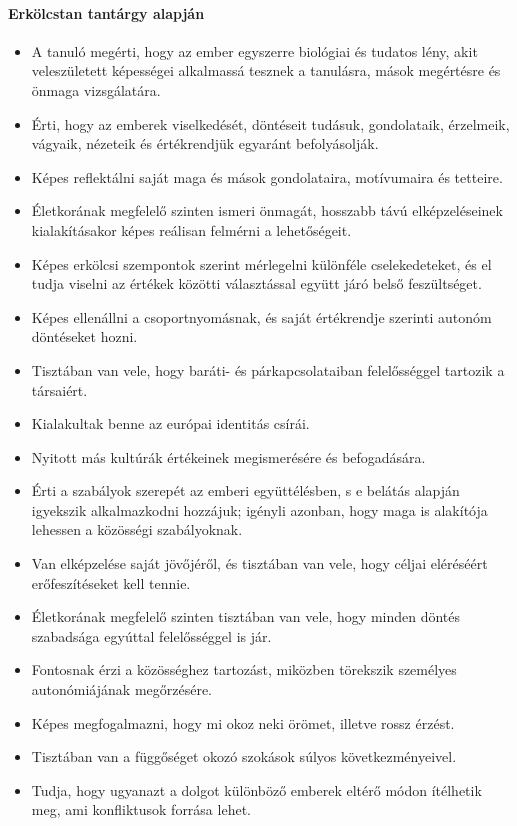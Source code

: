 \paragraph{Erkölcstan tantárgy alapján}
\begin{itemize}
\item A tanuló megérti, hogy az ember egyszerre biológiai és tudatos lény, akit veleszületett képességei alkalmassá tesznek a tanulásra, mások megértésre és önmaga vizsgálatára.
\item Érti, hogy az emberek viselkedését, döntéseit tudásuk, gondolataik, érzelmeik, vágyaik, nézeteik és értékrendjük egyaránt befolyásolják.
\item Képes reflektálni saját maga és mások gondolataira, motívumaira és tetteire.
\item Életkorának megfelelő szinten ismeri önmagát, hosszabb távú elképzeléseinek kialakításakor képes reálisan felmérni a lehetőségeit.
\item Képes erkölcsi szempontok szerint mérlegelni különféle cselekedeteket, és el tudja viselni az értékek közötti választással együtt járó belső feszültséget.
\item Képes ellenállni a csoportnyomásnak, és saját értékrendje szerinti autonóm döntéseket hozni.
\item Tisztában van vele, hogy baráti- és párkapcsolataiban felelősséggel tartozik a társaiért.
\item Kialakultak benne az európai identitás csírái.
\item Nyitott más kultúrák értékeinek megismerésére és befogadására.
\item Érti a szabályok szerepét az emberi együttélésben, s e belátás alapján igyekszik alkalmazkodni hozzájuk; igényli azonban, hogy maga is alakítója lehessen a közösségi szabályoknak.
\item Van elképzelése saját jövőjéről, és tisztában van vele, hogy céljai eléréséért erőfeszítéseket kell tennie.
\item Életkorának megfelelő szinten tisztában van vele, hogy minden döntés szabadsága egyúttal felelősséggel is jár.
\item Fontosnak érzi a közösséghez tartozást, miközben törekszik személyes autonómiájának megőrzésére.
\item Képes megfogalmazni, hogy mi okoz neki örömet, illetve rossz érzést.
\item Tisztában van a függőséget okozó szokások súlyos következményeivel.
\item Tudja, hogy ugyanazt a dolgot különböző emberek eltérő módon ítélhetik meg, ami konfliktusok forrása lehet.
\end{itemize}
